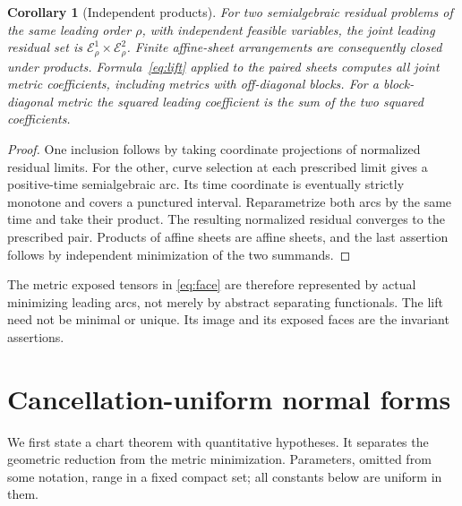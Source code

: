 \documentclass[11pt,reqno]{amsart}
\numberwithin{equation}{section}
\newtheorem{corollary}[theorem]{Corollary}
\theoremstyle{definition}
\theoremstyle{remark}
\newcommand{\cE}{\mathcal E}
\begin{document}
\begin{corollary}[Independent products]\label{cor:product}
For two semialgebraic residual problems of the same leading order $\rho$, with independent feasible variables, the joint leading residual set is $\cE_\rho^1\times\cE_\rho^2$. Finite affine-sheet arrangements are consequently closed under products. Formula~\eqref{eq:lift} applied to the paired sheets computes all joint metric coefficients, including metrics with off-diagonal blocks. For a block-diagonal metric the squared leading coefficient is the sum of the two squared coefficients.
\end{corollary}
\begin{proof}
One inclusion follows by taking coordinate projections of normalized residual limits. For the other, curve selection at each prescribed limit gives a positive-time semialgebraic arc. Its time coordinate is eventually strictly monotone and covers a punctured interval. Reparametrize both arcs by the same time and take their product. The resulting normalized residual converges to the prescribed pair. Products of affine sheets are affine sheets, and the last assertion follows by independent minimization of the two summands.
\end{proof}
The metric exposed tensors in \eqref{eq:face} are therefore represented by actual minimizing leading arcs, not merely by abstract separating functionals. The lift need not be minimal or unique. Its image and its exposed faces are the invariant assertions.

\section{Cancellation-uniform normal forms}\label{sec:wall}
We first state a chart theorem with quantitative hypotheses. It separates the geometric reduction from the metric minimization. Parameters, omitted from some notation, range in a fixed compact set; all constants below are uniform in them.
\end{document}
